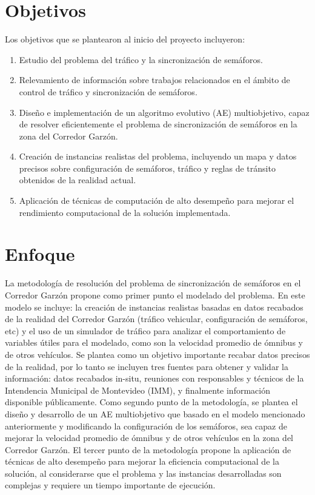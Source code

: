\section{Objetivos}

Los objetivos que se plantearon al inicio del proyecto incluyeron:
\begin{enumerate}
  \setlength{\itemsep}{0pt}
	\item Estudio del problema del tráfico y la sincronización de semáforos.
	\item Relevamiento de información sobre trabajos relacionados en el ámbito de control de tráfico y sincronización de semáforos.
	\item Diseño e implementación de un algoritmo evolutivo (AE) multiobjetivo, capaz de resolver eficientemente el problema de sincronización de semáforos en la zona del Corredor Garzón.
	\item Creación de instancias realistas del problema, incluyendo un mapa y datos precisos sobre configuración de semáforos, tráfico y reglas de tránsito obtenidos de la realidad actual.	
	\item Aplicación de técnicas de computación de alto desempeño para mejorar el rendimiento computacional de la solución implementada.

\end{enumerate}
 
\section{Enfoque}
La metodología de resolución del problema de sincronización de semáforos en el Corredor Garzón propone como primer punto el modelado del problema. En este modelo se incluye: la creación de instancias realistas basadas en datos recabados de la realidad del Corredor Garzón (tráfico vehicular, configuración de semáforos, etc) y el uso de un simulador de tráfico para analizar el comportamiento de variables útiles para el modelado, como son la velocidad promedio de ómnibus y de otros vehículos. Se plantea como un objetivo importante recabar datos precisos de la realidad, por lo tanto se incluyen tres fuentes para obtener y validar la información: datos recabados in-situ, reuniones con responsables y técnicos de la Intendencia Municipal de Montevideo (IMM), y finalmente información disponible públicamente.
Como segundo punto de la metodología, se plantea el diseño y desarrollo de un AE multiobjetivo que basado en el modelo mencionado anteriormente y modificando la configuración de los semáforos, sea capaz de mejorar la velocidad promedio de ómnibus y de otros vehículos en la zona del Corredor Garzón. 
El tercer punto de la metodología propone la aplicación de técnicas de alto desempeño para mejorar la eficiencia computacional de la solución, al considerarse que el problema y las instancias desarrolladas son complejas y requiere un tiempo importante de ejecución.



